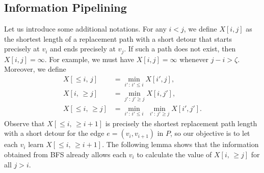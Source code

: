 \subsection{Information Pipelining} 
Let us introduce some additional notations. For any $i < j$, we define $X[i, j]$ as the shortest length of a replacement path with a short detour that starts precisely at $v_i$ and ends precisely at $v_j$. If such a path does not exist, then $X[i, j] = \infty$. For example, we must have $X[i, j] = \infty$ whenever $j-i > \zeta$. %
Moreover, we define
\begin{align*}
X[\leq i,\,j] &= \min_{i' \, : \, i' \leq i} X[i', j],\\
X[i,\,\geq j] &= \min_{j' \, : \, j' \geq j} X[i, j'],\\
X[\leq i,\,\geq j] &= \min_{i' \, : \, i' \leq i} \, \, \min_{i' \, : \, j' \geq j} X[i', j'].
\end{align*}
Observe that $X[\leq i, \, \geq i+1]$ is precisely the shortest replacement path length with a short detour for the edge $e=(v_i, v_{i+1})$ in $P$, so our objective is to let each $v_i$ learn $X[\leq i, \, \geq i+1]$. The following lemma shows that the information obtained from BFS already allows each $v_i$ to calculate the value of $X[i, \, \geq j]$ for all $j > i$.

